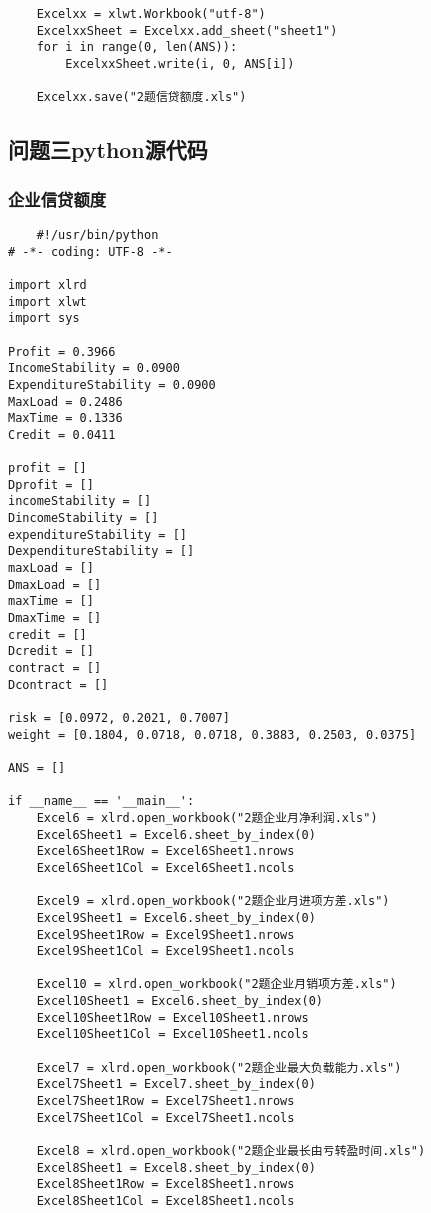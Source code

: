 \documentclass[dvipsnames,withoutpreface,bwprint]{cumcmthesis}
\begin{document}
\begin{appendices}
\begin{lstlisting}
    Excelxx = xlwt.Workbook("utf-8")
    ExcelxxSheet = Excelxx.add_sheet("sheet1")
    for i in range(0, len(ANS)):
        ExcelxxSheet.write(i, 0, ANS[i])

    Excelxx.save("2题信贷额度.xls")
\end{lstlisting}
\subsection{问题三python源代码}
\subsubsection{企业信贷额度}
\begin{lstlisting}
    #!/usr/bin/python
# -*- coding: UTF-8 -*-

import xlrd
import xlwt
import sys

Profit = 0.3966
IncomeStability = 0.0900
ExpenditureStability = 0.0900
MaxLoad = 0.2486
MaxTime = 0.1336
Credit = 0.0411

profit = []
Dprofit = []
incomeStability = []
DincomeStability = []
expenditureStability = []
DexpenditureStability = []
maxLoad = []
DmaxLoad = []
maxTime = []
DmaxTime = []
credit = []
Dcredit = []
contract = []
Dcontract = []

risk = [0.0972, 0.2021, 0.7007]
weight = [0.1804, 0.0718, 0.0718, 0.3883, 0.2503, 0.0375]

ANS = []

if __name__ == '__main__':
    Excel6 = xlrd.open_workbook("2题企业月净利润.xls")
    Excel6Sheet1 = Excel6.sheet_by_index(0)
    Excel6Sheet1Row = Excel6Sheet1.nrows
    Excel6Sheet1Col = Excel6Sheet1.ncols

    Excel9 = xlrd.open_workbook("2题企业月进项方差.xls")
    Excel9Sheet1 = Excel6.sheet_by_index(0)
    Excel9Sheet1Row = Excel9Sheet1.nrows
    Excel9Sheet1Col = Excel9Sheet1.ncols

    Excel10 = xlrd.open_workbook("2题企业月销项方差.xls")
    Excel10Sheet1 = Excel6.sheet_by_index(0)
    Excel10Sheet1Row = Excel10Sheet1.nrows
    Excel10Sheet1Col = Excel10Sheet1.ncols

    Excel7 = xlrd.open_workbook("2题企业最大负载能力.xls")
    Excel7Sheet1 = Excel7.sheet_by_index(0)
    Excel7Sheet1Row = Excel7Sheet1.nrows
    Excel7Sheet1Col = Excel7Sheet1.ncols

    Excel8 = xlrd.open_workbook("2题企业最长由亏转盈时间.xls")
    Excel8Sheet1 = Excel8.sheet_by_index(0)
    Excel8Sheet1Row = Excel8Sheet1.nrows
    Excel8Sheet1Col = Excel8Sheet1.ncols


\end{lstlisting}
\end{appendices}
\end{document}
